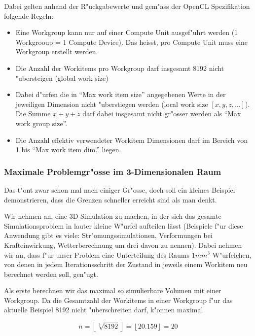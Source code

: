 \begin{refsection}
\begin{description}
\end{description}


\noindent Dabei gelten anhand der R"uckgabewerte und gem"ass der OpenCL
Spezifikation\cite{crypto:opencl_ref} folgende Regeln:

\begin{itemize}
 \item Eine Workgroup kann nur auf einer Compute Unit ausgef"uhrt werden (1 Workgrooup = 1 
       Compute Device). Das heisst, pro Compute Unit muss eine Workgroup erstellt werden.
 \item Die Anzahl der Workitems pro Workgroup darf insgesamt 8192 nicht "ubersteigen (global work size)
 \item Dabei d"urfen die in ``Max work item size'' angegebenen Werte in der jeweiligen 
       Dimension nicht "uberstiegen werden (local work size $[x,y,z,\ldots]$).
			 Die Summe $x + y + z$ darf dabei insgesamt nicht gr"osser werden als ``Max work group size''.
 \item Die Anzahl effektiv verwendeter Workitem Dimensionen darf im Bereich von 1 bis
       ``Max work item dim.'' liegen.
\end{itemize}


\subsubsection {Maximale Problemgr"osse im 3-Dimensionalen Raum}

Das t"ont zwar schon mal nach einiger Gr"osse, doch soll ein kleines Beispiel
demonstrieren, dass die Grenzen schneller erreicht sind als man denkt.

Wir nehmen an, eine 3D-Simulation zu machen, in der sich das gesamte
Simulationsproblem in lauter kleine W"urfel aufteilen lässt (Beispiele f"ur diese
Anwendung gibt es viele: Str"omungssimulationen, Verformungen bei Krafteinwirkung,
Wetterberechnung um drei davon zu nennen). Dabei nehmen wir an, dass f"ur unser 
Problem eine Unterteilung des Raums $1 mm^{3}$ W"urfelchen, von denen in jedem 
Iterationsschritt der Zustand in jeweils einem Workitem neu berechnet werden soll, 
gen"ugt.

Als erste berechnen wir das maximal so simulierbare Volumen mit einer Workgroup.
Da die Gesamtzahl der Workitems in einer Workgroup f"ur das aktuelle Beispiel
8192 nicht "uberschreiten darf, k"onnen maximal

\[
 n = \left\lfloor\sqrt[3]{8192}\right\rfloor = \left\lfloor20.159\right\rfloor = 20
\]


\end{refsection}
